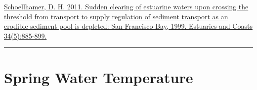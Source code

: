 \documentclass[
]{book}
\begin{document}
\begin{disclaimer}
\href{https://link.springer.com/article/10.1007/s12237-011-9382-x}{Schoellhamer,
D. H. 2011. Sudden clearing of estuarine waters upon crossing the
threshold from transport to supply regulation of sediment transport as
an erodible sediment pool is depleted: San Francisco Bay, 1999.
Estuaries and Coasts 34(5):885-899.}
\end{disclaimer}

\begin{center}\rule{0.5\linewidth}{0.5pt}\end{center}

\hypertarget{spring-water-temperature}{%
\section{Spring Water Temperature}\label{spring-water-temperature}}
\end{document}
